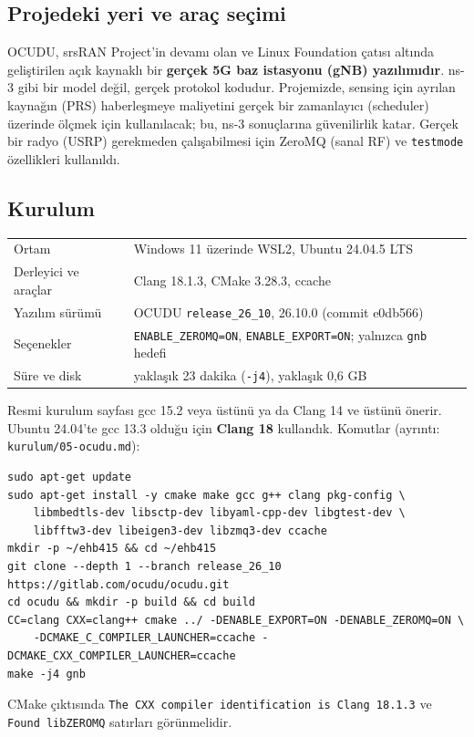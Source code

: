 
\subsection*{Projedeki yeri ve araç seçimi}
OCUDU, srsRAN Project'in devamı olan ve Linux Foundation çatısı altında geliştirilen açık kaynaklı bir \textbf{gerçek 5G baz istasyonu (gNB) yazılımıdır}. ns-3 gibi bir model değil, gerçek protokol kodudur. Projemizde, sensing için ayrılan kaynağın (PRS) haberleşmeye maliyetini gerçek bir zamanlayıcı (scheduler) üzerinde ölçmek için kullanılacak; bu, ns-3 sonuçlarına güvenilirlik katar. Gerçek bir radyo (USRP) gerekmeden çalışabilmesi için ZeroMQ (sanal RF) ve \texttt{testmode} özellikleri kullanıldı.

\subsection*{Kurulum}
\begin{center}\sffamily\small
\begin{tabular}{@{}ll@{}}
\toprule
Ortam & Windows 11 üzerinde WSL2, Ubuntu 24.04.5 LTS \\
Derleyici ve araçlar & Clang 18.1.3, CMake 3.28.3, ccache \\
Yazılım sürümü & OCUDU \texttt{release\_26\_10}, 26.10.0 (commit e0db566) \\
Seçenekler & \texttt{ENABLE\_ZEROMQ=ON}, \texttt{ENABLE\_EXPORT=ON}; yalnızca \texttt{gnb} hedefi \\
Süre ve disk & yaklaşık 23 dakika (\texttt{-j4}), yaklaşık 0,6 GB \\
\bottomrule
\end{tabular}
\end{center}
Resmi kurulum sayfası gcc 15.2 veya üstünü ya da Clang 14 ve üstünü önerir. Ubuntu 24.04'te gcc 13.3 olduğu için \textbf{Clang 18} kullandık. Komutlar (ayrıntı: \texttt{kurulum/05-ocudu.md}):
\begin{lstlisting}
sudo apt-get update
sudo apt-get install -y cmake make gcc g++ clang pkg-config \
    libmbedtls-dev libsctp-dev libyaml-cpp-dev libgtest-dev \
    libfftw3-dev libeigen3-dev libzmq3-dev ccache
mkdir -p ~/ehb415 && cd ~/ehb415
git clone --depth 1 --branch release_26_10 https://gitlab.com/ocudu/ocudu.git
cd ocudu && mkdir -p build && cd build
CC=clang CXX=clang++ cmake ../ -DENABLE_EXPORT=ON -DENABLE_ZEROMQ=ON \
    -DCMAKE_C_COMPILER_LAUNCHER=ccache -DCMAKE_CXX_COMPILER_LAUNCHER=ccache
make -j4 gnb
\end{lstlisting}
CMake çıktısında \texttt{The CXX compiler identification is Clang 18.1.3} ve \texttt{Found libZEROMQ} satırları görünmelidir.

